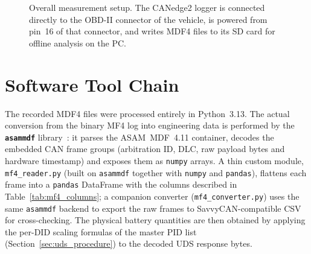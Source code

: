 \documentclass[11pt,a4paper,oneside,parskip=half]{scrreprt}
\begin{document}
\begin{figure}[H]
\centering
{}
\caption{Overall measurement setup. The CANedge2 logger is connected directly to the OBD-II connector of the vehicle, is powered from pin~16 of that connector, and writes MDF4 files to its SD card for offline analysis on the PC.}
\label{fig:setup}
\end{figure}

\section{Software Tool Chain}
The recorded MDF4 files were processed entirely in Python~3.13. The actual conversion from the binary MF4 log into engineering data is performed by the \textbf{\texttt{asammdf}} library~\cite{asammdf}: it parses the ASAM~MDF~4.11 container, decodes the embedded CAN frame groups (arbitration ID, DLC, raw payload bytes and hardware timestamp) and exposes them as \texttt{numpy} arrays. A thin custom module, \texttt{mf4\_reader.py} (built on \texttt{asammdf} together with \texttt{numpy} and \texttt{pandas}), flattens each frame into a \texttt{pandas} DataFrame with the columns described in Table~\ref{tab:mf4_columns}; a companion converter (\texttt{mf4\_converter.py}) uses the same \texttt{asammdf} backend to export the raw frames to SavvyCAN-compatible CSV for cross-checking. The physical battery quantities are then obtained by applying the per-DID scaling formulas of the master PID list (Section~\ref{sec:uds_procedure}) to the decoded UDS response bytes.
\end{document}
